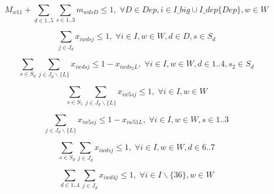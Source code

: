 \begin{equation}
M_{w11} + \sum_{d \in 1..5}\sum_{s \in 1..3} m_{wdsD} \leq 1, \; \forall D \in Dep, i \in I\_big \cup I\_dep\{Dep\}, w \in W
\end{equation}

\begin{equation}
\sum_{j \in J_d} x_{iwdsj} \leq 1, \; \forall i \in I, w \in W, d \in D, s \in S_d
\end{equation}

\begin{equation}
\sum_{s \in S_d}\sum_{j \in J_d\backslash \{L\}} x_{iwdsj} \leq 1 - x_{iwds_2L}, \; \forall i \in I, w \in W, d \in 1..4, s_2 \in S_d
\end{equation}

\begin{equation}
\sum_{s \in S_5}\sum_{j \in J_d\backslash \{L\}} x_{iw5sj} \leq 1, \; \forall i \in I, w \in W
\end{equation}

\begin{equation}
\sum_{j \in J_d\backslash \{L\}} x_{iw5sj} \leq 1 - x_{iw51L}, \; \forall i \in I, w \in W, s \in 1..3
\end{equation}

\begin{equation}
\sum_{s \in S_d}\sum_{j \in J_d} x_{iwdsj} \leq 1, \; \forall i \in I, w \in W, d \in 6..7
\end{equation}

\begin{equation}
\sum_{d \in 1..4}\sum_{j \in J_d} x_{iwd4j} \leq 1, \; \forall i \in I \backslash \{36\}, w \in W
\end{equation}

%
%
%	
%
%
